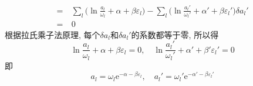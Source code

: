 \begin{solution}
\begin{align*}
= & ~\sum_{l}\bigg(\ln\frac{a_{l}}{\omega_{l}}+\alpha+\beta\varepsilon_{l}\bigg)-\sum_{l}\bigg(\ln\frac{a_{l}'}{\omega_{l}'}+\alpha'+\beta\varepsilon_{l}'\bigg)\delta a_{l}'\\
= & ~0
\end{align*}
根据拉氏乘子法原理, 每个$\delta a_{l}$和$\delta a_{l}'$的系数都等于零, 所以得
\[
\ln \frac{a_l}{\omega_l} + \alpha + \beta \varepsilon_l = 0,\quad
\ln \frac{a_l'}{\omega_l'} + \alpha' + \beta' \varepsilon_l' = 0
\]
即
\[
a_l = \omega_l \mathrm{e}^{-\alpha - \beta \varepsilon_l},\quad
a_l' = \omega_l' \mathrm{e}^{-\alpha' - \beta \varepsilon_l'}
\]










\end{solution}
